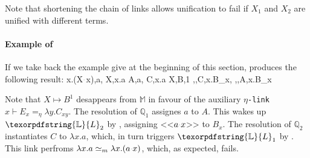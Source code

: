 \documentclass[sigconf,natbib=false,review]{acmart}
\newcommand{\appsep}{\ensuremath{\textcolor{lightgray}{\cdot}}}
\newcommand{\UnifRel}{\ensuremath{\simeq}}
\newcommand{\Ue}{\ensuremath{\UnifRel_m}\xspace}
\newcommand{\linkMacro}[1]{\ensuremath{#1}\texttt{-link}\xspace}
\newcommand{\linketa} {\linkMacro{\eta}}
\newcommand{\Fo}{\texorpdfstring{\ensuremath{\mathcal{O}\xspace}}{O}} %
\newcommand{\linketaM}[3]{\ensuremath{#1 \vdash #2 =_\eta #3}}
\newcommand{\mapping}[3]{\ensuremath{#1 \mapsto #2^#3}}
\newcommand{\rhs}{rhs\xspace}
\newcommand{\linkStore}{\texorpdfstring{\ensuremath{\mathbb{L}}\xspace}{L}}
\newcommand{\mapStore}{\texorpdfstring{\ensuremath{\mathbb{M}}\xspace}{M}}
\newcommand{\hoUnifPb}{\ensuremath{\mathbb{Q}}\xspace}
\begin{document}
\noindent
Note that shortening the chain of links allows unification to fail if
$X_1$ and $X_2$ are unified with different terms.

\paragraph{Example of \mapdeduplication}
If we take back the example give at the beginning of this section,
\mapdeduplication produces the following result:
% 
\printAlll
  {{{\lambda x.(X\appsep x),a},
    {X,\lambda x.a}}}
  {{{A,a},
    {C,\lambda x.a}}}
  {{{X,B,1}}}
  {{{\eta,,C,\lambda x.B_{x}},
    {\eta,,A,\lambda x.B_{x}}}}

\noindent
Note that $\mapping{X}{B}{1}$ desappears from \mapStore
in favour of the auxiliary \linketa \linketaM{x}{E_{x}}{\lambda y.C_{x y}}.
The resolution of $\hoUnifPb_1$ assignes $a$ to $A$. This wakes up
$\linkStore_2$ by \progressetaleft, assigning <<$a \appsep x$>> to $B_x$.
The resolution of $\hoUnifPb_2$ instantiates $C$ to $\lambda x.a$, which, in
turn triggers $\linkStore_1$ by \progressetaleft. This link perfroms
$\lambda x.a \Ue \lambda x.(a \appsep x)$, which, as expected, fails.

\begin{comment}
\printAlll
  {{{\lambda x.\lambda y.(X\appsep y\appsep x),\lambda x.\lambda y.x},
    {\lambda x.(f\appsep (X\appsep x)\appsep x),Y}}}
  {{{A,\lambda x.\lambda y.x},
    {D,F}}}
  {{{Y,F,0},
    {X,C,2}}}
  {{{\eta,x,E_{x},\lambda y.C_{x y}},
    {\eta,,D,\lambda x.(f\appsep E_{x}\appsep x)},
    {\eta,,A,\lambda x.B_{x}},
    {\eta,x,B_{x},\lambda y.C_{y x}}}}

\noindent
The resolution of $\hoUnifPb_1$ assigns $\lambda x.\lambda y.x$ to $A$
that in turn triggers $\linkStore_3$ and then $\linkStore_4$ by \progressetaleft,
one per $\lambda$ in the solution of $A$.
The unification variable $C_{yx}$ is therefore unified with $x$
(the second variable of its scope).
As a result $\linkStore_1$ becomes \linketaM{x}{E_x}{\lambda y.y},
and the \rhs is no more in \maybeeta so \progressetaright fires and
$E_x$ is unified with $\lambda y.y$; then $\linkStore_2$ makes progress thanks to the same 
rule giving
$\sigma = \{~ A \mapsto \lambda x.\lambda y.x ~;~ B_x \mapsto \lambda y.x ~;~ C_{yx} \mapsto x ~;~ D \mapsto f\appsep (\lambda y.y) ~;~ E_x \mapsto \lambda y.y ~\}$.\\
The remaining step $\hoUnifPb_2$ identifies $D$ with $F$,
hence the resulting \Fo{} substitution is
$\rho = \{X \mapsto \lambda x.\lambda y.y ~;~ Y \mapsto f\appsep (\lambda y.y)\}$.
\end{comment}
\end{document}
